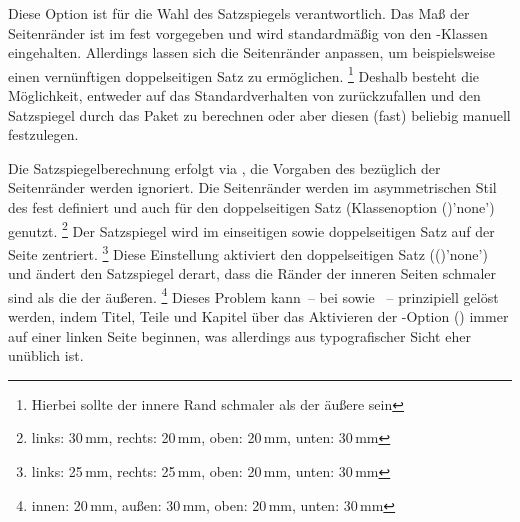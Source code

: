 \begin{DeclareEntity*}{}
\begin{DeclareEntity*}{}
\begin{DeclareEntity*}{}
\begin{Declaration}
Diese Option ist für die Wahl des Satzspiegels verantwortlich. Das Maß der 
Seitenränder ist im \CD fest vorgegeben und wird standardmäßig von den 
\TUDScript-Klassen eingehalten. Allerdings lassen sich die Seitenränder 
anpassen, um beispielsweise einen vernünftigen doppelseitigen Satz zu 
ermöglichen.%
\footnote{Hierbei sollte der innere Rand schmaler als der äußere sein}
Deshalb besteht die Möglichkeit, entweder auf das Standardverhalten von 
\KOMAScript{} zurückzufallen und den Satzspiegel durch das Paket 
 zu berechnen oder aber diesen (fast) beliebig manuell 
festzulegen.
\begin{DeclareValues}
  Die Satzspiegelberechnung erfolgt via , die Vorgaben des 
  \CDs bezüglich der Seitenränder werden ignoriert. 
  Die Seitenränder werden im asymmetrischen Stil des \CDs fest definiert und 
  auch für den doppelseitigen Satz
  (Klassenoption ()'none') genutzt.%
  \footnote{links: 30\,mm, rechts: 20\,mm, oben: 20\,mm, unten: 30\,mm}
  Der Satzspiegel wird im einseitigen sowie doppelseitigen Satz auf der Seite 
  zentriert.%
  \footnote{links: 25\,mm, rechts: 25\,mm, oben: 20\,mm, unten: 30\,mm}
  Diese Einstellung aktiviert den doppelseitigen Satz 
  (()'none') und ändert den Satzspiegel 
  derart, dass die Ränder der inneren Seiten schmaler sind als die der äußeren.%
  \footnote{innen: 20\,mm, außen: 30\,mm, oben: 20\,mm, unten: 30\,mm}
  Dieses Problem kann~-- bei  sowie ~-- 
  prinzipiell gelöst werden, indem Titel, Teile und Kapitel über das Aktivieren 
  der \KOMAScript-Option () immer auf 
  einer linken Seite beginnen, was allerdings aus typografischer Sicht eher 
  unüblich ist.
\end{DeclareValues}


\end{Declaration}
\end{DeclareEntity*}
\end{DeclareEntity*}
\end{DeclareEntity*}
